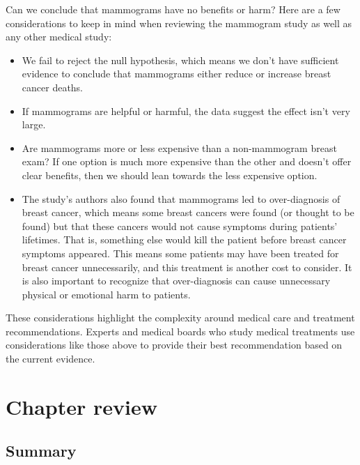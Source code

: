 \documentclass[
  10pt,
  openany]{book}
\providecommand{\tightlist}{%
  \setlength{\itemsep}{0pt}\setlength{\parskip}{0pt}}
\begin{document}
Can we conclude that mammograms have no benefits or harm?
Here are a few considerations to keep in mind when reviewing the mammogram study as well as any other medical study:

\begin{itemize}
\tightlist
\item
  We fail to reject the null hypothesis, which means we don't have sufficient evidence to conclude that mammograms either reduce or increase breast cancer deaths.
\item
  If mammograms are helpful or harmful, the data suggest the effect isn't very large.
\item
  Are mammograms more or less expensive than a non-mammogram breast exam? If one option is much more expensive than the other and doesn't offer clear benefits, then we should lean towards the less expensive option.
\item
  The study's authors also found that mammograms led to over-diagnosis of breast cancer, which means some breast cancers were found (or thought to be found) but that these cancers would not cause symptoms during patients' lifetimes. That is, something else would kill the patient before breast cancer symptoms appeared. This means some patients may have been treated for breast cancer unnecessarily, and this treatment is another cost to consider. It is also important to recognize that over-diagnosis can cause unnecessary physical or emotional harm to patients.
\end{itemize}

These considerations highlight the complexity around medical care and treatment recommendations.
Experts and medical boards who study medical treatments use considerations like those above to provide their best recommendation based on the current evidence.

\clearpage

\hypertarget{chp17-review}{%
\section{Chapter review}\label{chp17-review}}

\hypertarget{summary-10}{%
\subsection{Summary}\label{summary-10}}
\end{document}
